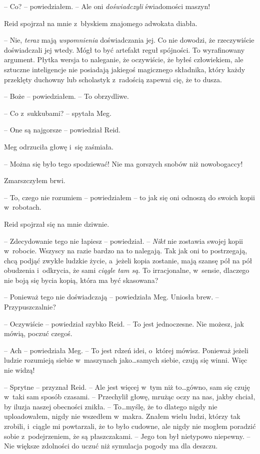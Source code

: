 \documentclass[oneside,polish,11pt,sfheadings]{mwbk}
\begin{document}
-- Co? -- powiedziałem. -- Ale oni \emph{doświadczyli} świadomości maszyn!

Reid spojrzał na mnie z~błyskiem znajomego adwokata diabła. 

-- Nie, \emph{teraz} mają \emph{wspomnienia} doświadczania jej. Co nie dowodzi,
że rzeczywiście doświadczali jej wtedy. Mógł to być artefakt reguł
spójności. To wyrafinowany argument. Płytka wersja to naleganie, że
oczywiście, że byłeś człowiekiem, ale sztuczne inteligencje nie
posiadają jakiegoś magicznego składnika, który każdy przeklęty duchowny
lub scholastyk z~radością zapewni cię, że to dusza.

-- Boże -- powiedziałem. -- To obrzydliwe.

-- Co z~sukkubami? -- spytała Meg.

-- One są najgorsze -- powiedział Reid.

Meg odrzuciła głowę i~się zaśmiała.

-- Można się było tego spodziewać!
Nie ma gorszych snobów niż nowobogaccy!

Zmarszczyłem brwi. 


-- To, czego nie rozumiem -- powiedziałem -- to jak się
oni odnoszą do swoich kopii w~robotach.

Reid spojrzał się na mnie dziwnie. 


-- Zdecydowanie tego nie łapiesz -- powiedział. -- \emph{Nikt} nie zostawia swojej kopii w~robocie. Wszyscy
na razie bardzo na to nalegają. Tak jak oni to postrzegają, chcą podjąć
zwykłe ludzkie życie, a~jeżeli kopia zostanie, mają szansę pół na pół
obudzenia i~odkrycia, że sami \emph{ciągle tam są}. To irracjonalne, w~sensie, dlaczego nie boją się bycia kopią, która ma być skasowana?

-- Ponieważ tego nie doświadczają -- powiedziała Meg. Uniosła brew. -- Przypuszczalnie?

-- Oczywiście -- powiedział szybko Reid. -- To jest jednoczesne. Nie
możesz, jak mówią, poczuć czegoś.

-- Ach -- powiedziała Meg. -- To jest rdzeń idei, o~której mówisz. Ponieważ
jeżeli ludzie rozumieją siebie w~maszynach jako\ldots samych siebie, czują
się winni. Więc nie widzą!

-- Sprytne -- przyznał Reid. -- Ale jest więcej w~tym niż to\ldots gówno, sam
się czuję w~taki sam sposób czasami. -- Przechylił głowę, mrużąc oczy na
nas, jakby chciał, by iluzja naszej obecności znikła. -- To\ldots myślę, że
to dlatego nigdy nie uploadowałem, nigdy nie wszedłem w~makra. Znałem
wielu ludzi, którzy tak zrobili, i~ciągle mi powtarzali, że to było
cudowne, ale nigdy nie mogłem poradzić sobie z~podejrzeniem, że są
płaszczakami. -- Jego ton był nietypowo niepewny. -- Nie większe zdolności
do uczuć niż symulacja pogody ma dla deszczu.
\end{document}
